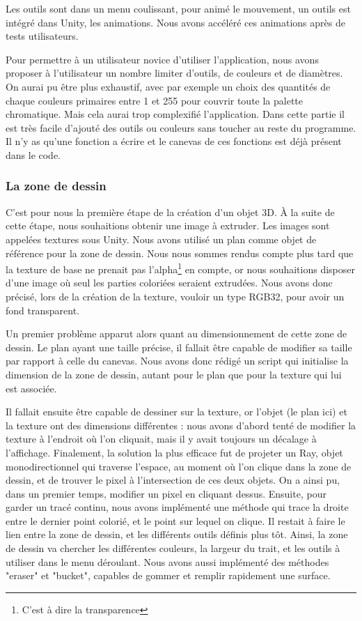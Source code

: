 \documentclass[a4paper,11pt]{article}
\begin{document}
				Les outils sont dans un menu coulissant, pour animé le mouvement, un outils est intégré dans Unity, les animations. Nous avons accéléré ces animations après de tests utilisateurs.
					
				Pour permettre à un utilisateur novice d'utiliser l'application, nous avons proposer à l'utilisateur un nombre limiter d'outils, de couleurs et de diamètres. On aurai pu être plus exhaustif, avec par exemple un choix des quantités de chaque couleurs primaires entre 1 et 255 pour couvrir toute la palette chromatique. Mais cela aurai trop complexifié l'application.
				Dans cette partie il est très facile d'ajouté des outils ou couleurs sans toucher au reste du programme. Il n'y as qu'une fonction a écrire et le canevas de ces fonctions est déjà présent dans le code.
			\subsubsection{La zone de dessin}
			
			C'est pour nous la première étape de la création d'un objet 3D. À la suite de cette étape, nous souhaitions obtenir une image à extruder. Les images sont appelées textures sous Unity. Nous avons utilisé un plan comme objet de référence pour la zone de dessin. Nous nous sommes rendus compte plus tard que la texture de base ne prenait pas l'alpha\footnote{C'est à dire la transparence} en compte, or nous souhaitions disposer d'une image où seul les parties coloriées seraient extrudées. Nous avons donc précisé, lors de la création de la texture, vouloir un type RGB32, pour avoir un fond transparent.
			
			Un premier problème apparut alors quant au dimensionnement de cette zone de dessin. Le plan ayant une taille précise, il fallait être capable de modifier sa taille par rapport à celle du canevas. Nous avons donc rédigé un script qui initialise la dimension de la zone de dessin, autant pour le plan que pour la texture qui lui est associée.
			
			Il fallait ensuite être capable de dessiner sur la texture, or l'objet (le plan ici) et la texture ont des dimensions différentes : nous avons d'abord tenté de modifier la texture à l'endroit où l'on cliquait, mais il y avait toujours un décalage à l'affichage. Finalement, la solution la plus efficace fut de projeter un Ray, objet monodirectionnel qui traverse l'espace, au moment où l'on clique dans la zone de dessin, et de trouver le pixel à l'intersection de ces deux objets. On a ainsi pu, dans un premier temps, modifier un pixel en cliquant dessus. Ensuite, pour garder un tracé continu, nous avons implémenté une méthode qui trace la droite entre le dernier point colorié, et le point sur lequel on clique. Il restait à faire le lien entre la zone de dessin, et les différents outils définis plus tôt. Ainsi, la zone de dessin va chercher les différentes couleurs, la largeur du trait, et les outils à utiliser dans le menu déroulant. Nous avons aussi implémenté des méthodes "eraser" et "bucket", capables de gommer et remplir rapidement une surface.
			
\end{document}
